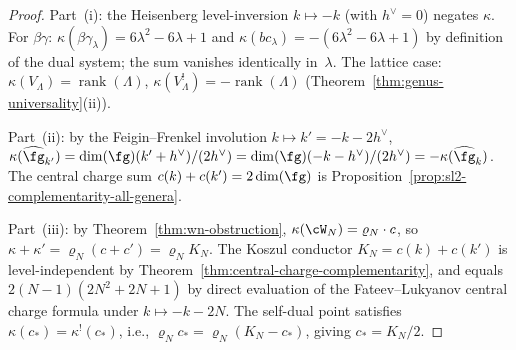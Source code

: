 \begin{proof}
Part~(i): the Heisenberg level-inversion $k \mapsto -k$
(with $h^\vee = 0$) negates $\kappa$. For $\beta\gamma$:
$\kappa(\beta\gamma_\lambda) = 6\lambda^2 - 6\lambda + 1$ and
$\kappa(bc_\lambda) = -(6\lambda^2 - 6\lambda + 1)$ by definition
of the dual system; the sum vanishes identically in~$\lambda$.
The lattice case: $\kappa(V_\Lambda) = \operatorname{rank}(\Lambda)$,
$\kappa(V_\Lambda^!) = -\operatorname{rank}(\Lambda)$
(Theorem~\ref{thm:genus-universality}(ii)).

Part~(ii): by the Feigin--Frenkel involution $k \mapsto k' = -k - 2h^\vee$,
$\kappa(\widehat{\fg}_{k'})
= \dim(\fg)(k' + h^\vee)/(2h^\vee)
= \dim(\fg)(-k - h^\vee)/(2h^\vee)
= -\kappa(\widehat{\fg}_k)$.
The central charge sum
$c(k) + c(k') = 2\dim(\fg)$ is Proposition~\ref{prop:sl2-complementarity-all-genera}.

Part~(iii): by Theorem~\ref{thm:wn-obstruction},
$\kappa(\cW_N) = \varrho_N \cdot c$, so
$\kappa + \kappa' = \varrho_N(c + c') = \varrho_N K_N$.
The Koszul conductor $K_N = c(k) + c(k')$ is level-independent by
Theorem~\ref{thm:central-charge-complementarity}, and equals
$2(N{-}1)(2N^2{+}2N{+}1)$ by direct evaluation of the
Fateev--Lukyanov central charge formula under $k \mapsto -k - 2N$.
The self-dual point satisfies
$\kappa(c_*) = \kappa^!(c_*)$, i.e.,
$\varrho_N c_* = \varrho_N(K_N - c_*)$, giving $c_* = K_N/2$.
\end{proof}

